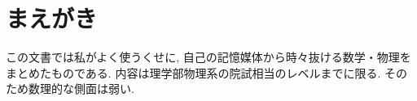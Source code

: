 \chapter*{まえがき}
この文書では私がよく使うくせに, 自己の記憶媒体から時々抜ける数学・物理をまとめたものである. 内容は理学部物理系の院試相当のレベルまでに限る. そのため数理的な側面は弱い. 
